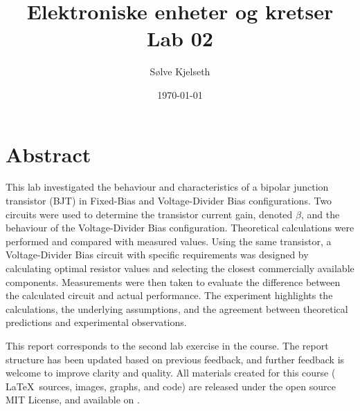 \documentclass{article}
\title{\fontsize{24}{36}\selectfont Elektroniske enheter og kretser\\ %
Lab 02} %
\author{{\ttfamily Sølve Kjelseth}} %
\date{\today} %
\begin{document}
\maketitle %

\section{Abstract} %
This lab investigated the behaviour and characteristics of a bipolar junction transistor (BJT) in Fixed-Bias and Voltage-Divider Bias configurations.
Two circuits were used to determine the transistor current gain, denoted \(\beta\), and the behaviour of the Voltage-Divider Bias configuration.
Theoretical calculations were performed and compared with measured values.
Using the same transistor, a Voltage-Divider Bias circuit with specific requirements was designed by calculating optimal resistor values and selecting the closest commercially available components.
Measurements were then taken to evaluate the difference between the calculated circuit and actual performance.
The experiment highlights the calculations, the underlying assumptions, and the agreement between theoretical predictions and experimental observations.


\vfill %
This report corresponds to the second lab exercise in the course.
The report structure has been updated based on previous feedback, and further feedback is welcome to improve clarity and quality.
All materials created for this course (%
\LaTeX~sources, images, graphs, and code) are released under the open source MIT License, and available on
.

\clearpage

\tableofcontents %
\hfill
\listoffigures %
\hfill
\listoftables %

\end{document}
